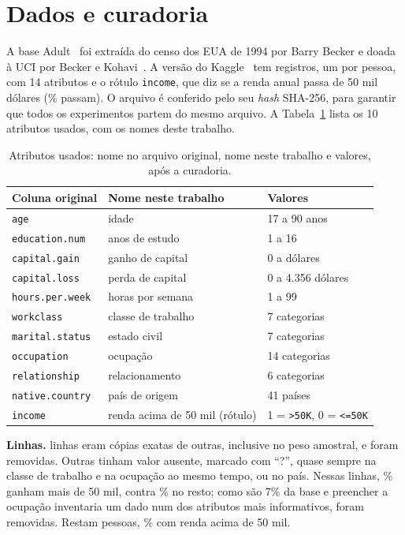 \section{Dados e curadoria}\label{sec:sv_dados}

A base Adult~\cite{uci:adult} foi extraída do censo dos EUA de 1994 por Barry Becker e doada à UCI por Becker e Kohavi~\cite{kohavi:96}. A versão do Kaggle~\cite{kaggle:adult} tem \svLinhasBrutas{} registros, um por pessoa, com 14 atributos e o rótulo \texttt{income}, que diz se a renda anual passa de 50 mil dólares (\svPositivosBrutos\% passam). O arquivo é conferido pelo seu \emph{hash} SHA-256, para garantir que todos os experimentos partem do mesmo arquivo. A Tabela~\ref{tab:sv_atributos} lista os 10 atributos usados, com os nomes deste trabalho.

\begin{table}[ht]
\centering
\caption{Atributos usados: nome no arquivo original, nome neste trabalho e valores, após a curadoria.}
\label{tab:sv_atributos}
\footnotesize
\begin{tabular}{lll}
\toprule
Coluna original & Nome neste trabalho & Valores \\
\midrule
\texttt{age} & idade & 17 a 90 anos \\
\texttt{education.num} & anos de estudo & 1 a 16 \\
\texttt{capital.gain} & ganho de capital & 0 a \svGanhoMax{} dólares \\
\texttt{capital.loss} & perda de capital & 0 a 4.356 dólares \\
\texttt{hours.per.week} & horas por semana & 1 a 99 \\
\texttt{workclass} & classe de trabalho & 7 categorias \\
\texttt{marital.status} & estado civil & 7 categorias \\
\texttt{occupation} & ocupação & 14 categorias \\
\texttt{relationship} & relacionamento & 6 categorias \\
\texttt{native.country} & país de origem & 41 países \\
\texttt{income} & renda acima de 50 mil (rótulo) & 1 = \texttt{>50K}, 0 = \texttt{<=50K} \\
\bottomrule
\end{tabular}
\end{table}

\textbf{Linhas.} \svDuplicadas{} linhas eram cópias exatas de outras, inclusive no peso amostral, e foram removidas. Outras \svAusentes{} tinham valor ausente, marcado com ``?'', quase sempre na classe de trabalho e na ocupação ao mesmo tempo, ou no país. Nessas linhas, \svPositivosAusentes\% ganham mais de 50 mil, contra \svPositivos\% no resto; como são 7\% da base e preencher a ocupação inventaria um dado num dos atributos mais informativos, foram removidas. Restam \svLinhas{} pessoas, \svPositivos\% com renda acima de 50 mil.

